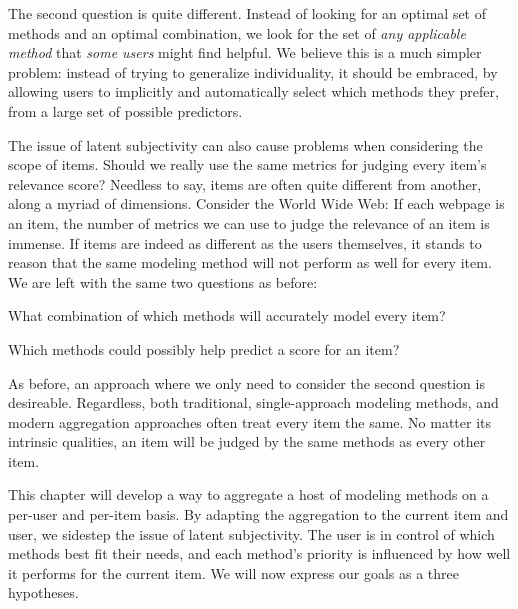 The second question is quite different. 
Instead of looking for an optimal set of methods and an optimal combination,
we look for the set of \emph{any applicable method} that \emph{some users} might find helpful.
We believe this is a much simpler problem: 
instead of trying to generalize individuality,
it should be embraced, by allowing users to implicitly and automatically select which methods they prefer,
from a large set of possible predictors.

The issue of latent subjectivity can also cause problems when considering the scope of items.
Should we really use the same metrics for judging every item's relevance score?
Needless to say, items are often quite different from another,
along a myriad of dimensions. Consider the World Wide Web:
If each webpage is an item, the number of metrics we can use to judge
the relevance of an item is immense.
If items are indeed as different as the users themselves, it stands to reason that the same 
modeling method will not perform as well for every item.
We are left with the same two questions as before:

\begin{enumerate*}
  \item What combination of which methods will accurately model every item?
  \item Which methods could possibly help predict a score for an item?
\end{enumerate*}

As before, an approach where we only need to consider the second question is desireable.
Regardless, both traditional, single-approach modeling methods, and modern aggregation approaches
often treat every item the same. No matter its intrinsic qualities, an item will be judged
by the same methods as every other item. 

This chapter will develop a way to aggregate a host of modeling methods on a per-user and per-item basis.
By adapting the aggregation to the current item and user, we sidestep the issue of
latent subjectivity. The user is in control of which methods best fit their needs, and
each method's priority is influenced by how well it performs for the current item.
We will now express our goals as a three hypotheses.

